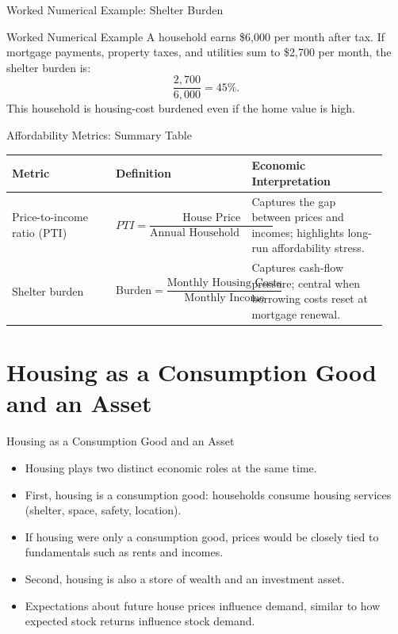 \documentclass[aspectratio=169]{beamer}
\begin{document}
\begin{frame}{Worked Numerical Example: Shelter Burden}
\transfade
\begin{block}{Worked Numerical Example}
A household earns \$6{,}000 per month after tax. If mortgage payments, property taxes, and utilities sum to \$2{,}700 per month, the shelter burden is:
\[
\frac{2{,}700}{6{,}000} = 45\%.
\]
This household is housing-cost burdened even if the home value is high.
\end{block}
\end{frame}

\begin{frame}{Affordability Metrics: Summary Table}
\transfade
\begin{center}
\small
\setlength{\tabcolsep}{4pt}
\renewcommand{\arraystretch}{1.2}
\begin{tabular}{p{0.26\linewidth} p{0.34\linewidth} p{0.34\linewidth}}
\toprule
\textbf{Metric} & \textbf{Definition} & \textbf{Economic Interpretation} \\
\midrule
Price-to-income ratio (PTI) &
$PTI=\dfrac{\text{House Price}}{\text{Annual Household Income}}$ &
Captures the gap between prices and incomes; highlights long-run affordability stress. \\
\addlinespace[0.4em]
Shelter burden &
$\text{Burden}=\dfrac{\text{Monthly Housing Costs}}{\text{Monthly Income}}$ &
Captures cash-flow pressure; central when borrowing costs reset at mortgage renewal. \\
\bottomrule
\end{tabular}
\end{center}
\end{frame}

\section{Housing as a Consumption Good and an Asset}

\begin{frame}{Housing as a Consumption Good and an Asset}
\transfade
\begin{itemize}[<+->]
  \item Housing plays two distinct economic roles at the same time.
  \item First, housing is a consumption good: households consume housing services (shelter, space, safety, location).
  \item If housing were only a consumption good, prices would be closely tied to fundamentals such as rents and incomes.
  \item Second, housing is also a store of wealth and an investment asset.
  \item Expectations about future house prices influence demand, similar to how expected stock returns influence stock demand.
\end{itemize}
\end{frame}
\end{document}
